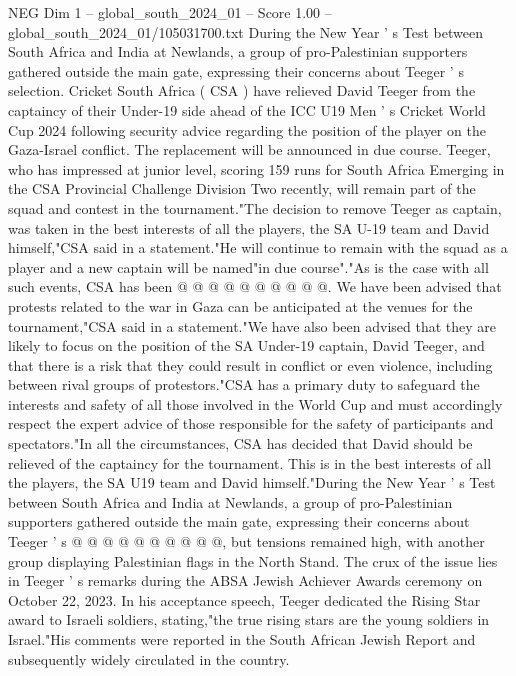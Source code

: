 \begin{textsample}{NEG Dim 1 – global\_south\_2024\_01 – Score 1.00 – global\_south\_2024\_01/105031700.txt}  \label{ex:f1_neg_335}
During the New Year ' s Test between South Africa and India at Newlands, a group of pro-Palestinian supporters gathered outside the main gate, expressing their concerns about Teeger ' s selection.
Cricket South Africa ( CSA ) have relieved David Teeger from the captaincy of their Under-19 side ahead of the ICC U19 Men ' s Cricket World Cup 2024 following security advice regarding the position of the player on the Gaza-Israel conflict.
The replacement will be announced in due course.
Teeger, who has impressed at junior level, scoring 159 runs for South Africa Emerging in the CSA Provincial Challenge Division Two recently, will remain part of the squad and contest in the tournament."The decision to remove Teeger as captain, was taken in the best interests of all the players, the SA U-19 team and David himself,"CSA said in a statement."He will continue to remain with the squad as a player and a new captain will be named"in due course"."As is the case with all such events, CSA has been @ @ @ @ @ @ @ @ @ @.
We have been advised that protests related to the war in Gaza can be anticipated at the venues for the tournament,"CSA said in a statement."We have also been advised that they are likely to focus on the position of the SA Under-19 captain, David Teeger, and that there is a risk that they could result in conflict or even violence, including between rival groups of protestors."CSA has a primary duty to safeguard the interests and safety of all those involved in the World Cup and must accordingly respect the expert advice of those responsible for the safety of participants and spectators."In all the circumstances, CSA has decided that David should be relieved of the captaincy for the tournament.
This is in the best interests of all the players, the SA U19 team and David himself."During the New Year ' s Test between South Africa and India at Newlands, a group of pro-Palestinian supporters gathered outside the main gate, expressing their concerns about Teeger ' s @ @ @ @ @ @ @ @ @ @, but tensions remained high, with another group displaying Palestinian flags in the North Stand.
The crux of the issue lies in Teeger ' s remarks during the ABSA Jewish Achiever Awards ceremony on October 22, 2023.
In his acceptance speech, Teeger dedicated the Rising Star award to Israeli soldiers, stating,"the true rising stars are the young soldiers in Israel."His comments were reported in the South African Jewish Report and subsequently widely circulated in the country.

\end{textsample}
